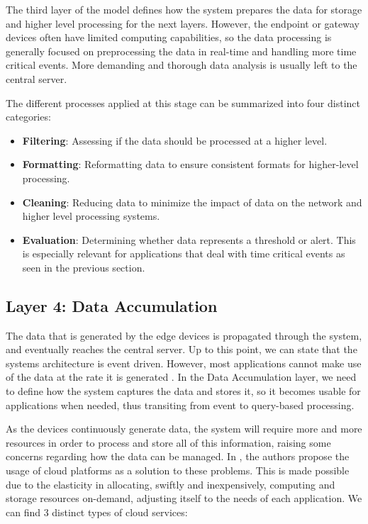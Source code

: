 The third layer of the model defines how the system prepares the data for storage and higher level processing for the next layers. However, the endpoint or gateway devices often have limited computing capabilities, so the data processing is generally focused on preprocessing the data in real-time and handling more time critical events. More demanding and thorough data analysis is usually left to the central server. \bigskip

The different processes applied at this stage can be summarized into four distinct categories:

\begin{itemize}
    \item \textbf{Filtering}: Assessing if the data should be processed at a higher level. 
    \item \textbf{Formatting}: Reformatting data to ensure consistent formats for higher-level processing.
    \item \textbf{Cleaning}: Reducing data to minimize the impact of data on the network and higher level processing systems.
    \item \textbf{Evaluation}: Determining whether data represents a threshold or alert. This is especially relevant for applications that deal with time critical events as seen in the previous section.
\end{itemize}


\subsection{Layer 4: Data Accumulation}
\label{sec:iot-model-layer4}

The data that is generated by the edge devices is propagated through the system, and eventually reaches the central server. Up to this point, we can state that the systems architecture is event driven. However, most applications cannot make use of the data at the rate it is generated \cite{10.5555/3161403}. In the Data Accumulation layer, we need to define how the system captures the data and stores it, so it becomes usable for applications when needed, thus transiting from event to query-based processing. \bigskip

As the devices continuously generate data, the system will require more and more resources in order to process and store all of this information, raising some concerns regarding how the data can be managed. In \cite{Doukas2012}, the authors propose the usage of cloud platforms as a solution to these problems. This is made possible due to the elasticity in allocating, swiftly and inexpensively, computing and storage resources on-demand, adjusting itself to the needs of each application. We can find 3 distinct types of cloud services: %

